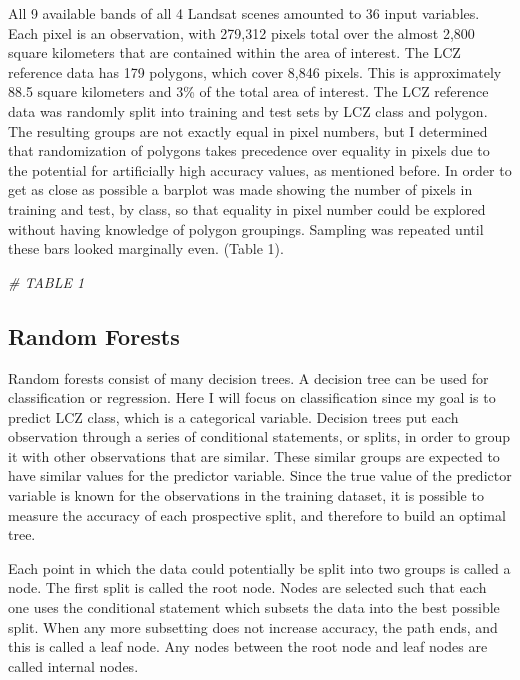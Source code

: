 \documentclass[
]{article}
\newenvironment{Shaded}{\begin{snugshade}}{\end{snugshade}}
\newcommand{\CommentTok}[1]{\textcolor[rgb]{0.56,0.35,0.01}{\textit{#1}}}
\begin{document}
All 9 available bands of all 4 Landsat scenes amounted to 36 input
variables. Each pixel is an observation, with 279,312 pixels total over
the almost 2,800 square kilometers that are contained within the area of
interest. The LCZ reference data has 179 polygons, which cover 8,846
pixels. This is approximately 88.5 square kilometers and 3\% of the
total area of interest. The LCZ reference data was randomly split into
training and test sets by LCZ class and polygon. The resulting groups
are not exactly equal in pixel numbers, but I determined that
randomization of polygons takes precedence over equality in pixels due
to the potential for artificially high accuracy values, as mentioned
before. In order to get as close as possible a barplot was made showing
the number of pixels in training and test, by class, so that equality in
pixel number could be explored without having knowledge of polygon
groupings. Sampling was repeated until these bars looked marginally
even. (Table 1).

\begin{Shaded}
\begin{Highlighting}[]
\CommentTok{\# TABLE 1}
\end{Highlighting}
\end{Shaded}

\hypertarget{random-forests}{%
\subsection{Random Forests}\label{random-forests}}

Random forests consist of many decision trees. A decision tree can be
used for classification or regression. Here I will focus on
classification since my goal is to predict LCZ class, which is a
categorical variable. Decision trees put each observation through a
series of conditional statements, or splits, in order to group it with
other observations that are similar. These similar groups are expected
to have similar values for the predictor variable. Since the true value
of the predictor variable is known for the observations in the training
dataset, it is possible to measure the accuracy of each prospective
split, and therefore to build an optimal tree.

Each point in which the data could potentially be split into two groups
is called a node. The first split is called the root node. Nodes are
selected such that each one uses the conditional statement which subsets
the data into the best possible split. When any more subsetting does not
increase accuracy, the path ends, and this is called a leaf node. Any
nodes between the root node and leaf nodes are called internal nodes.
\end{document}
